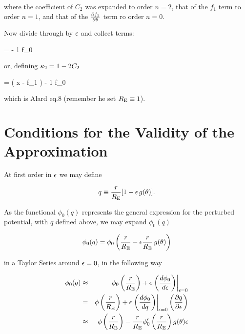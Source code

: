 where the coefficient of $C_2$ was expanded to order $n=2$, that of
the $f_1$ term to order $n=1$, and that of the $\partial f_1 \over \partial
\theta$ term ro order $n=0$.  



Now divide through by $\epsilon$ and collect terms:

\beq
 \vecy = \left[ (1-2 C_2) x -  f_1 \right]  - {1 \over \re} {\prtl f_0 \over \prtl \te} \hat{\theta}
\eeq

or, defining $\kappa_2 = 1-2 C_2$

\beq
\label{eq:rsexpanded}
\vecy = ( \kt x - f_1 )  - {1 \over \re} {\prtl f_0 \over \prtl \te}  \hat{\theta}
\eeq

which is Alard eq.8 (remember he set $R_{\mathrm{E}} \equiv 1$).


\section{Conditions for the Validity of the Approximation}

At first order in $\epsilon$ we may define

\begin{equation}
 q \equiv \frac{r}{R_{\mathrm{E}}}[1-\epsilon\,g(\theta)].
\end{equation}

As the functional $\phi_0(q)$ represents the general expression
for the perturbed potential, with $q$ defined above, we may expand $\phi_0(q)$

\begin{displaymath}
 \phi_0(q)=\phi_0\left(\dfrac{r}{R_{\mathrm{E}}}-\epsilon\dfrac{r}{R_{\mathrm{E}}}\,g(\theta)\right)
\end{displaymath}

\noindent in a Taylor Series around $\epsilon=0$, in the following way

\def\dpdq{ \left. \left( \frac{d\phi_0}{dq}\right) \right|_{\eps=0} }
\def\dpde{ \left. \left( \frac{d\phi_0}{d\eps}\right) \right|_{\eps=0} }

\begin{eqnarray}
 \phi_0(q) &\approx& \phi_0\prre+\eps \dpde \\
	  & = & \phi\prre+\eps \dpdq  \left(\frac{\prtl q}{\prtl \eps}\right)\\
	  &\approx& \phi\prre-\rre\phi_0^\prime\prre g(\te)\eps \label{key1}
\end{eqnarray}

